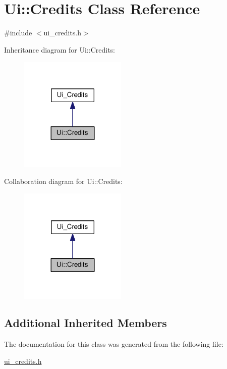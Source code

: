 \hypertarget{classUi_1_1Credits}{\section{Ui\-:\-:Credits Class Reference}
\label{classUi_1_1Credits}
}


{\ttfamily \#include $<$ui\-\_\-credits.\-h$>$}



Inheritance diagram for Ui\-:\-:Credits\-:\nopagebreak
\begin{figure}[H]
\begin{center}
\leavevmode
\includegraphics[width=144pt]{classUi_1_1Credits__inherit__graph}
\end{center}
\end{figure}


Collaboration diagram for Ui\-:\-:Credits\-:\nopagebreak
\begin{figure}[H]
\begin{center}
\leavevmode
\includegraphics[width=144pt]{classUi_1_1Credits__coll__graph}
\end{center}
\end{figure}
\subsection*{Additional Inherited Members}


The documentation for this class was generated from the following file\-:\begin{DoxyCompactItemize}
\item 
\hyperlink{ui__credits_8h}{ui\-\_\-credits.\-h}\end{DoxyCompactItemize}
